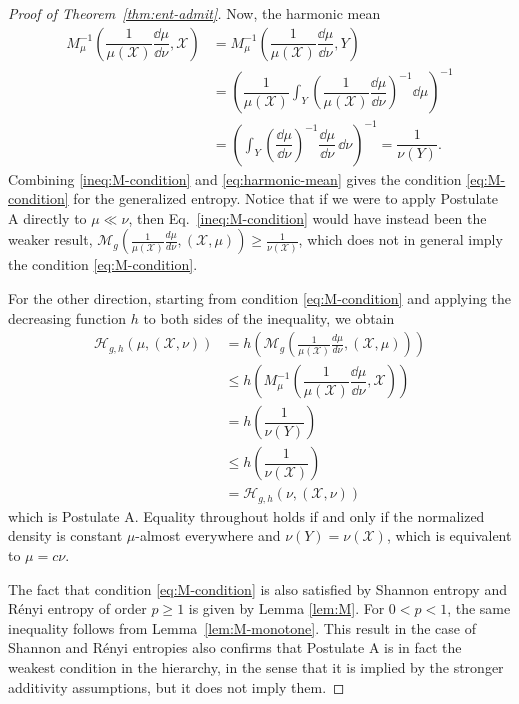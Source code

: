 \documentclass[reqno]{amsart}
\begin{document}
\begin{proof}[Proof of Theorem~\ref{thm:ent-admit}]
Now, the harmonic mean
\begin{align}
\label{eq:harmonic-mean}
    M_\mu^{-1}\left(\dfrac{1}{\mu(\mathcal{X}) }\dfrac{\dd \mu}{\dd \nu}, \mathcal{X} \right) 
    \nonumber
    &=M_\mu^{-1}\left(\dfrac{1}{\mu(\mathcal{X}) }\dfrac{\dd \mu}{\dd \nu}, Y \right)  \\
    \nonumber
    &= \left( \dfrac{1}{\mu(\mathcal{X})}\int_{Y}  \left( \dfrac{1}{\mu(\mathcal{X}) }\dfrac{\dd \mu}{\dd \nu} \right)^{-1} \dd \mu \right)^{-1} \\
    &= \left(\int_{Y}  \left( \dfrac{\dd \mu}{\dd \nu} \right)^{-1} \dfrac{\dd \mu}{\dd \nu} \, \dd \nu \right)^{-1} 
    = \dfrac{1}{\nu(Y)}.
\end{align}
Combining \eqref{ineq:M-condition} and \eqref{eq:harmonic-mean} gives the condition \eqref{eq:M-condition} for the generalized entropy. Notice that if we were to apply Postulate A directly to $\mu \ll \nu$, then Eq.~\eqref{ineq:M-condition} would have instead been the weaker result, $\mathcal{M}_g \left(
\frac{1}{\mu(\mathcal{X})}
\frac{d\mu}{d\nu},
(\mathcal{X},\mu)
\right)
\geq 
\frac{1}{\nu(\mathcal{X})}$, which does not in general imply the condition \eqref{eq:M-condition}.

For the other direction, starting from condition \eqref{eq:M-condition} and applying the decreasing function $h$ to both sides of the inequality, we obtain
\begin{align*}
\mathcal{H}_{g,h}(\mu,(\mathcal{X},\nu))
&=h\left(\mathcal{M}_g\left(
\frac{1}{\mu(\mathcal X)}
\frac{d\mu}{d\nu},
(\mathcal X,\mu)
\right)\right) \\
&\leq
h\left( M_\mu^{-1}\left(\dfrac{1}{\mu(\mathcal{X}) }\dfrac{\dd \mu}{\dd \nu}, \mathcal{X} \right) \right)\\
&=h\left(\dfrac{1}{\nu(Y)} \right) \\
&\leq 
h\left(\dfrac{1}{\nu(\mathcal{X})} \right) \\
&= \mathcal{H}_{g,h}(\nu,(\mathcal{X},\nu))
\end{align*}
which is Postulate A. 
Equality throughout holds if and only if the normalized density is constant $\mu$-almost everywhere and $\nu(Y)=\nu(\mathcal X)$, which is equivalent to $\mu=c\nu$.



The fact that condition \eqref{eq:M-condition} is also satisfied by Shannon entropy and R\'enyi entropy of order $p \geq1$ is given by Lemma \ref{lem:M}. For $0<p<1$, the same inequality follows from
Lemma~\ref{lem:M-monotone}.
This result in the case of Shannon  and R\'enyi entropies also confirms that Postulate A is in fact the weakest condition in the hierarchy, in the sense that it is implied by the stronger additivity assumptions, but it does not imply them.


\end{proof}
\end{document}
